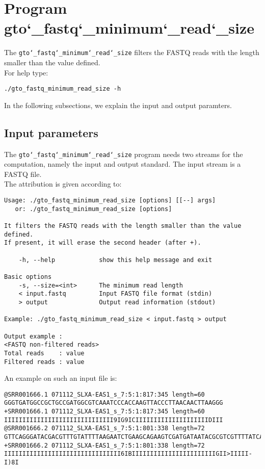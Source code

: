 \section{Program gto\char`_fastq\char`_minimum\char`_read\char`_size}
The \texttt{gto\char`_fastq\char`_minimum\char`_read\char`_size} filters the FASTQ reads with the length smaller than the value defined.\\
For help type:
\begin{lstlisting}
./gto_fastq_minimum_read_size -h
\end{lstlisting}
In the following subsections, we explain the input and output paramters.

\subsection*{Input parameters}

The \texttt{gto\char`_fastq\char`_minimum\char`_read\char`_size} program needs two streams for the computation,
namely the input and output standard. The input stream is a FASTQ file.\\
The attribution is given according to:
\begin{lstlisting}
Usage: ./gto_fastq_minimum_read_size [options] [[--] args]
   or: ./gto_fastq_minimum_read_size [options]

It filters the FASTQ reads with the length smaller than the value defined. 
If present, it will erase the second header (after +).

    -h, --help            show this help message and exit

Basic options
    -s, --size=<int>      The minimum read length
    < input.fastq         Input FASTQ file format (stdin)
    > output              Output read information (stdout)

Example: ./gto_fastq_minimum_read_size < input.fastq > output

Output example :
<FASTQ non-filtered reads>
Total reads    : value
Filtered reads : value
\end{lstlisting}
An example on such an input file is:
\begin{lstlisting}
@SRR001666.1 071112_SLXA-EAS1_s_7:5:1:817:345 length=60
GGGTGATGGCCGCTGCCGATGGCGTCAAATCCCACCAAGTTACCCTTAACAACTTAAGGG
+SRR001666.1 071112_SLXA-EAS1_s_7:5:1:817:345 length=60
IIIIIIIIIIIIIIIIIIIIIIIIIIIIII9IG9ICIIIIIIIIIIIIIIIIIIIIDIII
@SRR001666.2 071112_SLXA-EAS1_s_7:5:1:801:338 length=72
GTTCAGGGATACGACGTTTGTATTTTAAGAATCTGAAGCAGAAGTCGATGATAATACGCGTCGTTTTATCAT
+SRR001666.2 071112_SLXA-EAS1_s_7:5:1:801:338 length=72
IIIIIIIIIIIIIIIIIIIIIIIIIIIIIIII6IBIIIIIIIIIIIIIIIIIIIIIIIGII>IIIII-I)8I
\end{lstlisting}

